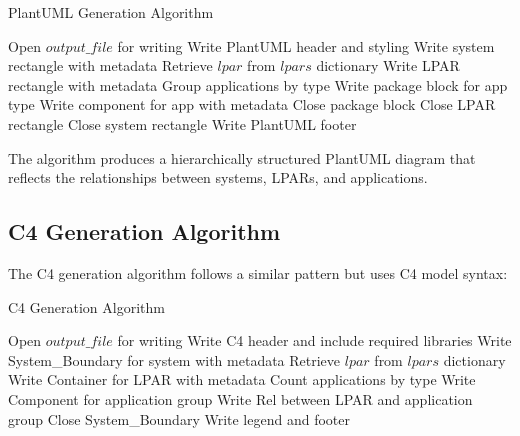 \documentclass[a4paper,12pt]{article}
\begin{document}
\begin{algorithm}
\caption{PlantUML Generation Algorithm}
\begin{algorithmic}[1]
    \State Open $output\_file$ for writing
    \State Write PlantUML header and styling
        \State Write system rectangle with metadata
            \State Retrieve $lpar$ from $lpars$ dictionary
            \State Write LPAR rectangle with metadata
            \State Group applications by type
                \State Write package block for app type
                    \State Write component for app with metadata
                \EndFor
                \State Close package block
            \EndFor
            \State Close LPAR rectangle
        \EndFor
        \State Close system rectangle
    \EndFor
    \State Write PlantUML footer
\EndProcedure
\end{algorithmic}
\end{algorithm}

The algorithm produces a hierarchically structured PlantUML diagram that reflects the relationships between systems, LPARs, and applications.

\subsection{C4 Generation Algorithm}

The C4 generation algorithm follows a similar pattern but uses C4 model syntax:

\begin{algorithm}
\caption{C4 Generation Algorithm}
\begin{algorithmic}[1]
    \State Open $output\_file$ for writing
    \State Write C4 header and include required libraries
        \State Write System\_Boundary for system with metadata
            \State Retrieve $lpar$ from $lpars$ dictionary
            \State Write Container for LPAR with metadata
            \State Count applications by type
                \State Write Component for application group
                \State Write Rel between LPAR and application group
            \EndFor
        \EndFor
        \State Close System\_Boundary
    \EndFor
    \State Write legend and footer
\EndProcedure
\end{algorithmic}
\end{algorithm}
\end{document}
